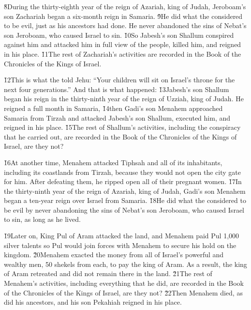 \v{8}During the thirty-eighth year of the reign of Azariah, king of Judah, Jeroboam's son Zachariah began a six-month reign in Samaria. \v{9}He did what the  considered to be evil, just as his ancestors had done. He never abandoned the sins of Nebat's son Jeroboam, who caused Israel to sin. \v{10}So Jabesh's son Shallum conspired against him and attacked him in full view of the people, killed him, and reigned in his place. \v{11}The rest of Zachariah's activities are recorded in the Book of the Chronicles of the Kings of Israel.

\v{12}This is what the  told Jehu: ``Your children will sit on Israel's throne for the next four generations.'' And that is what happened: \v{13}Jabesh's son Shallum began his reign in the thirty-ninth year of the reign of Uzziah, king of Judah. He reigned a full month in Samaria, \v{14}then Gadi's son Menahem approached Samaria from Tirzah and attacked Jabesh's son Shallum, executed him, and reigned in his place. \v{15}The rest of Shallum's activities, including the conspiracy that he carried out, are recorded in the Book of the Chronicles of the Kings of Israel, are they not?

\v{16}At another time, Menahem attacked Tiphsah and all of its inhabitants, including its coastlands from Tirzah, because they would not open the city gate for him. After defeating them, he ripped open all of their pregnant women. \v{17}In the thirty-ninth year of the reign of Azariah, king of Judah, Gadi's son Menahem began a ten-year reign over Israel from Samaria. \v{18}He did what the  considered to be evil by never abandoning the sins of Nebat's son Jeroboam, who caused Israel to sin, as long as he lived.

\v{19}Later on, King Pul of Aram attacked the land, and Menahem paid Pul 1,000 silver talents so Pul would join forces with Menahem to secure his hold on the kingdom. \v{20}Menahem exacted the money from all of Israel's powerful and wealthy men, 50 shekels from each, to pay the king of Aram. As a result, the king of Aram retreated and did not remain there in the land. \v{21}The rest of Menahem's activities, including everything that he did, are recorded in the Book of the Chronicles of the Kings of Israel, are they not? \v{22}Then Menahem died, as did his ancestors, and his son Pekahiah reigned in his place.

